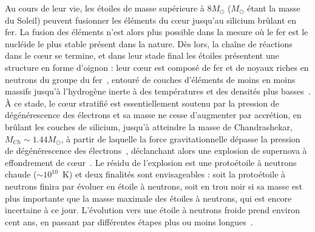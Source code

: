 Au cours de leur vie, les étoiles de masse supérieure à 8$M_\odot$ ($M_\odot$ 
étant la masse du Soleil) peuvent fusionner les éléments du c\oe ur jusqu'au 
silicium brûlant en fer. La fusion des éléments n'est alors plus possible 
dans la mesure où le fer est le nucléide le plus stable présent dans la nature. 
Dès lors, la chaîne de réactions dans le c\oe ur se termine, et dans leur stade 
final les étoiles présentent une structure en forme d'oignon : leur c\oe ur est 
composé de fer et de noyaux riches en neutrons du groupe du 
fer~\cite{Bethe1979}, entouré de couches d'éléments de moins en moins massifs 
jusqu'à l'hydrogène inerte à des températures et des densités plus 
basses~\cite{Woosley2002}. 
À ce stade, le c\oe ur stratifié est essentiellement soutenu par la 
pression de dégénérescence des électrons et sa masse ne cesse d'augmenter par 
accrétion, en brûlant les couches de silicium, jusqu'à atteindre la masse de 
Chandrashekar, $M_{Ch} \sim 1.44M_\odot$, à partir de laquelle la force 
gravitationnelle dépasse la pression de dégénérescence des 
électrons~\cite{Chandrasekhar1931}, déclanchant alors une explosion de 
supernova à effondrement de c\oe ur~\cite{Janka2007}. 
Le résidu de l'explosion est une protoétoile à neutrons chaude 
($\sim 10^{10}$~K) et deux finalités sont envisageables : soit la protoétoile à 
neutrons finira par évoluer en étoile à neutrons, soit en trou noir si sa 
masse est plus importante que la masse maximale des étoiles à neutrons, qui est 
encore incertaine à ce jour. 
L'évolution vers une étoile à neutrons froide prend environ cent ans, en 
passant par différentes étapes plus ou moins longues~\cite{Prakash1997}. 


